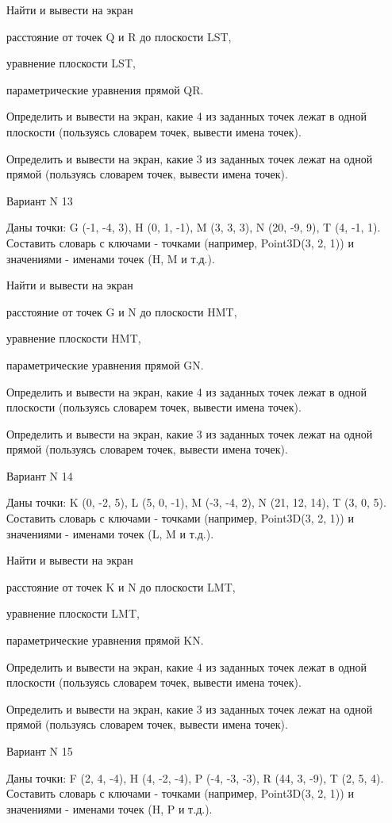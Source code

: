\documentclass[11pt]{report}
\begin{document}
 
Найти и вывести на экран


расстояние от точек Q и R до плоскости LST,

 
уравнение плоскости LST,

 
параметрические уравнения прямой QR.


Определить и вывести на экран, какие 4 из заданных точек лежат в одной плоскости (пользуясь словарем точек, вывести имена точек).


Определить и вывести на экран, какие 3 из заданных точек лежат на одной прямой (пользуясь словарем точек, вывести имена точек).

Вариант N 13

Даны точки: G (-1, -4, 3), H (0, 1, -1), M (3, 3, 3), N (20, -9, 9), T (4, -1, 1).
Составить словарь с ключами - точками (например, Point3D(3, 2, 1)) и значениями - именами точек (H, M и т.д.).

 
Найти и вывести на экран


расстояние от точек G и N до плоскости HMT,

 
уравнение плоскости HMT,

 
параметрические уравнения прямой GN.


Определить и вывести на экран, какие 4 из заданных точек лежат в одной плоскости (пользуясь словарем точек, вывести имена точек).


Определить и вывести на экран, какие 3 из заданных точек лежат на одной прямой (пользуясь словарем точек, вывести имена точек).

Вариант N 14

Даны точки: K (0, -2, 5), L (5, 0, -1), M (-3, -4, 2), N (21, 12, 14), T (3, 0, 5).
Составить словарь с ключами - точками (например, Point3D(3, 2, 1)) и значениями - именами точек (L, M и т.д.).

 
Найти и вывести на экран


расстояние от точек K и N до плоскости LMT,

 
уравнение плоскости LMT,

 
параметрические уравнения прямой KN.


Определить и вывести на экран, какие 4 из заданных точек лежат в одной плоскости (пользуясь словарем точек, вывести имена точек).


Определить и вывести на экран, какие 3 из заданных точек лежат на одной прямой (пользуясь словарем точек, вывести имена точек).

Вариант N 15

Даны точки: F (2, 4, -4), H (4, -2, -4), P (-4, -3, -3), R (44, 3, -9), T (2, 5, 4).
Составить словарь с ключами - точками (например, Point3D(3, 2, 1)) и значениями - именами точек (H, P и т.д.).
\end{document}
